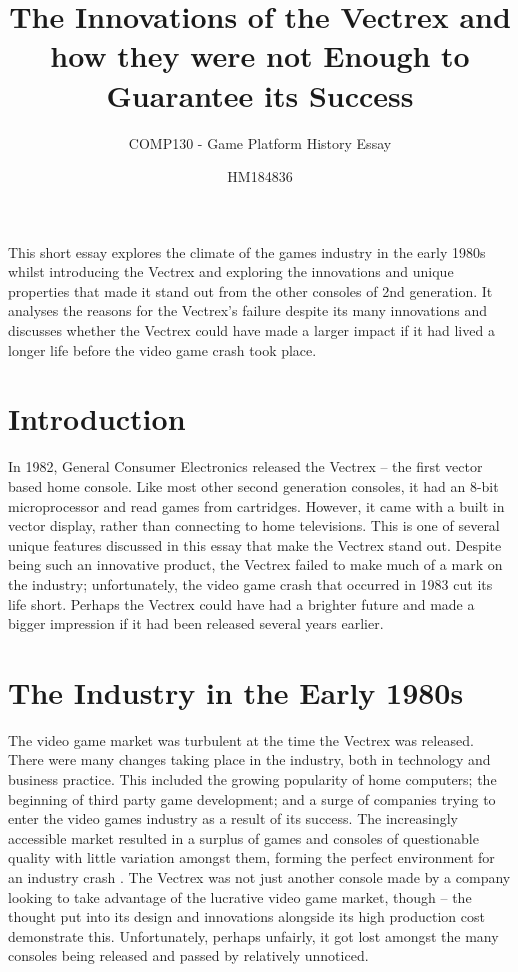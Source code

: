 \documentclass{scrartcl}
\title{The Innovations of the Vectrex and how they were not Enough to Guarantee its Success}
\subtitle{COMP130 - Game Platform History Essay}
\author{HM184836}
\begin{document}
\maketitle

\abstract
{
This short essay explores the climate of the games industry in the early 1980s whilst introducing the Vectrex and exploring the innovations and unique properties that made it stand out from the other consoles of 2nd generation. It analyses the reasons for the Vectrex's failure despite its many innovations and discusses whether the Vectrex could have made a larger impact if it had lived a longer life before the video game crash took place.
}


\section*{Introduction}
In 1982, General Consumer Electronics released the Vectrex -- the first vector based home console. Like most other second generation consoles, it had an 8-bit microprocessor and read games from cartridges. However, it came with a built in vector display, rather than connecting to home televisions. This is one of several unique features discussed in this essay that make the Vectrex stand out. Despite being such an innovative product, the Vectrex failed to make much of a mark on the industry; unfortunately, the video game crash that occurred in 1983 cut its life short. Perhaps the Vectrex could have had a brighter future and made a bigger impression if it had been released several years earlier.


\section*{The Industry in the Early 1980s}

The video game market was turbulent at the time the Vectrex was released. There were many changes taking place in the industry, both in technology and business practice. This included the growing popularity of home computers; the beginning of third party game development; and a surge of companies trying to enter the video games industry as a result of its success\cite{wolf:pong}. The increasingly accessible market resulted in a surplus of games and consoles of questionable quality with little variation amongst them, forming the perfect environment for an industry crash \cite{ernkvist:crash}. The Vectrex was not just another console made by a company looking to take advantage of the lucrative video game market, though -- the thought put into its design and innovations alongside its high production cost demonstrate this\cite{}. Unfortunately, perhaps unfairly, it got lost amongst the many consoles being released and passed by relatively unnoticed.
\end{document}
